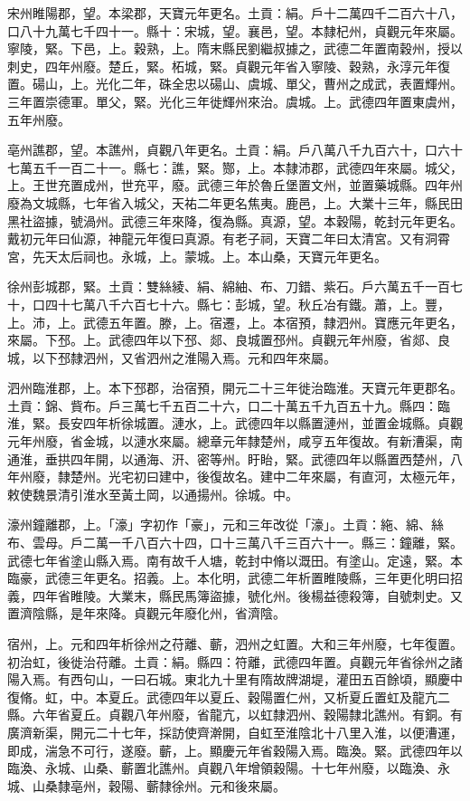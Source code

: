 \begin{pinyinscope}
 宋州睢陽郡，望。本梁郡，天寶元年更名。土貢：絹。戶十二萬四千二百六十八，口八十九萬七千四十一。縣十：宋城，望。襄邑，望。本隸杞州，貞觀元年來屬。寧陵，緊。下邑，上。穀熟，上。隋末縣民劉繼叔據之，武德二年置南穀州，授以刺史，四年州廢。楚丘，緊。柘城，緊。貞觀元年省入寧陵、穀熟，永淳元年復置。碭山，上。光化二年，硃全忠以碭山、虞城、單父，曹州之成武，表置輝州。三年置崇德軍。單父，緊。光化三年徙輝州來治。虞城。上。武德四年置東虞州，五年州廢。



 亳州譙郡，望。本譙州，貞觀八年更名。土貢：絹。戶八萬八千九百六十，口六十七萬五千一百二十一。縣七：譙，緊。酂，上。本隸沛郡，武德四年來屬。城父，上。王世充置成州，世充平，廢。武德三年於魯丘堡置文州，並置藥城縣。四年州廢為文城縣，七年省入城父，天祐二年更名焦夷。鹿邑，上。大業十三年，縣民田黑社盜據，號渦州。武德三年來降，復為縣。真源，望。本穀陽，乾封元年更名。戴初元年曰仙源，神龍元年復曰真源。有老子祠，天寶二年曰太清宮。又有洞霄宮，先天太后祠也。永城，上。蒙城。上。本山桑，天寶元年更名。



 徐州彭城郡，緊。土貢：雙絲綾、絹、綿紬、布、刀錯、紫石。戶六萬五千一百七十，口四十七萬八千六百七十六。縣七：彭城，望。秋丘冶有鐵。蕭，上。豐，上。沛，上。武德五年置。滕，上。宿遷，上。本宿預，隸泗州。寶應元年更名，來屬。下邳。上。武德四年以下邳、郯、良城置邳州。貞觀元年州廢，省郯、良城，以下邳隸泗州，又省泗州之淮陽入焉。元和四年來屬。



 泗州臨淮郡，上。本下邳郡，治宿預，開元二十三年徙治臨淮。天寶元年更郡名。土貢：錦、貲布。戶三萬七千五百二十六，口二十萬五千九百五十九。縣四：臨淮，緊。長安四年析徐城置。漣水，上。武德四年以縣置漣州，並置金城縣。貞觀元年州廢，省金城，以漣水來屬。總章元年隸楚州，咸亨五年復故。有新漕渠，南通淮，垂拱四年開，以通海、汧、密等州。盱眙，緊。武德四年以縣置西楚州，八年州廢，隸楚州。光宅初曰建中，後復故名。建中二年來屬，有直河，太極元年，敕使魏景清引淮水至黃土岡，以通揚州。徐城。中。



 濠州鐘離郡，上。「濠」字初作「豪」，元和三年改從「濠」。土貢：絁、綿、絲布、雲母。戶二萬一千八百六十四，口十三萬八千三百六十一。縣三：鐘離，緊。武德七年省塗山縣入焉。南有故千人塘，乾封中脩以溉田。有塗山。定遠，緊。本臨豪，武德三年更名。招義。上。本化明，武德二年析置睢陵縣，三年更化明曰招義，四年省睢陵。大業末，縣民馬簿盜據，號化州。後楊益德殺簿，自號刺史。又置濟陰縣，是年來降。貞觀元年廢化州，省濟陰。



 宿州，上。元和四年析徐州之苻離、蘄，泗州之虹置。大和三年州廢，七年復置。初治虹，後徙治苻離。土貢：絹。縣四：符離，武德四年置。貞觀元年省徐州之諸陽入焉。有西句山，一曰石城。東北九十里有隋故牌湖堤，灌田五百餘頃，顯慶中復脩。虹，中。本夏丘。武德四年以夏丘、穀陽置仁州，又析夏丘置虹及龍亢二縣。六年省夏丘。貞觀八年州廢，省龍亢，以虹隸泗州、穀陽隸北譙州。有銅。有廣濟新渠，開元二十七年，採訪使齊澣開，自虹至淮陰北十八里入淮，以便漕運，即成，湍急不可行，遂廢。蘄，上。顯慶元年省穀陽入焉。臨渙。緊。武德四年以臨渙、永城、山桑、蘄置北譙州。貞觀八年增領穀陽。十七年州廢，以臨渙、永城、山桑隸亳州，穀陽、蘄隸徐州。元和後來屬。




\end{pinyinscope}
